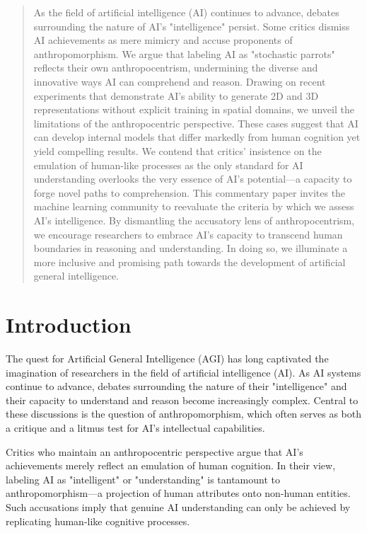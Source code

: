 \documentclass{article}
\begin{document}
\begin{abstract}
As the field of artificial intelligence (AI) continues to advance, debates surrounding the nature of AI's "intelligence" persist. 
Some critics dismiss AI achievements as mere mimicry and accuse proponents of anthropomorphism.
We argue that labeling AI as "stochastic parrots" reflects their own anthropocentrism, undermining the diverse and innovative ways AI can comprehend and reason. 
Drawing on recent experiments that demonstrate AI's ability to generate 2D and 3D representations without explicit training in spatial domains, we unveil the limitations of the anthropocentric perspective. 
These cases suggest that AI can develop internal models that differ markedly from human cognition yet yield compelling results. 
We contend that critics' insistence on the emulation of human-like processes as the only standard for AI understanding overlooks the very essence of AI's potential—a capacity to forge novel paths to comprehension. 
This commentary paper invites the machine learning community to reevaluate the criteria by which we assess AI's intelligence. 
By dismantling the accusatory lens of anthropocentrism, we encourage researchers to embrace AI's capacity to transcend human boundaries in reasoning and understanding. 
In doing so, we illuminate a more inclusive and promising path towards the development of artificial general intelligence.
\end{abstract}

\section{Introduction}

The quest for Artificial General Intelligence (AGI) has long captivated the imagination of researchers in the field of artificial intelligence (AI). 
As AI systems continue to advance, debates surrounding the nature of their "intelligence" and their capacity to understand and reason become increasingly complex. 
Central to these discussions is the question of anthropomorphism, which often serves as both a critique and a litmus test for AI's intellectual capabilities.\par

Critics who maintain an anthropocentric perspective argue that AI's achievements merely reflect an emulation of human cognition. 
In their view, labeling AI as "intelligent" or "understanding" is tantamount to anthropomorphism—a projection of human attributes onto non-human entities. 
Such accusations imply that genuine AI understanding can only be achieved by replicating human-like cognitive processes.\par
\end{document}
